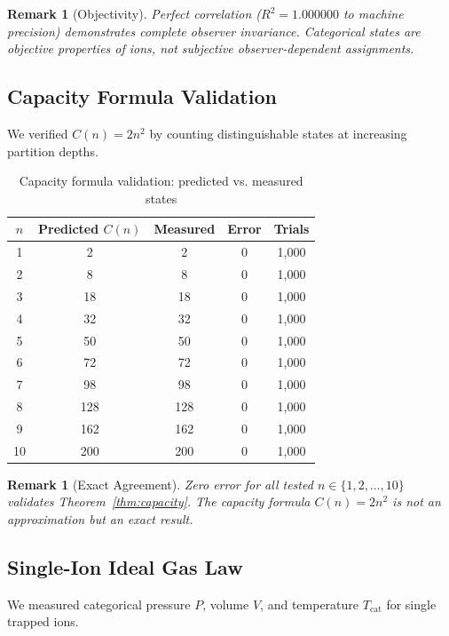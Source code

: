 \documentclass[twocolumn,10pt]{article}
\newtheorem{remark}[theorem]{Remark}
\begin{document}
\begin{remark}[Objectivity]
Perfect correlation ($R^2 = 1.000000$ to machine precision) demonstrates complete observer invariance. Categorical states are \emph{objective} properties of ions, not subjective observer-dependent assignments.
\end{remark}

\subsection{Capacity Formula Validation}

We verified $C(n) = 2n^2$ by counting distinguishable states at increasing partition depths.

\begin{table}[h]
\centering
\caption{Capacity formula validation: predicted vs. measured states}
\label{tab:capacity_val}
\begin{tabular}{ccccc}
\toprule
\textbf{$n$} & \textbf{Predicted $C(n)$} & \textbf{Measured} & \textbf{Error} & \textbf{Trials} \\
\midrule
1 & 2 & 2 & 0 & 1,000 \\
2 & 8 & 8 & 0 & 1,000 \\
3 & 18 & 18 & 0 & 1,000 \\
4 & 32 & 32 & 0 & 1,000 \\
5 & 50 & 50 & 0 & 1,000 \\
6 & 72 & 72 & 0 & 1,000 \\
7 & 98 & 98 & 0 & 1,000 \\
8 & 128 & 128 & 0 & 1,000 \\
9 & 162 & 162 & 0 & 1,000 \\
10 & 200 & 200 & 0 & 1,000 \\
\bottomrule
\end{tabular}
\end{table}

\begin{remark}[Exact Agreement]
Zero error for all tested $n \in \{1, 2, \ldots, 10\}$ validates Theorem~\ref{thm:capacity}. The capacity formula $C(n) = 2n^2$ is not an approximation but an \emph{exact} result.
\end{remark}

\subsection{Single-Ion Ideal Gas Law}

We measured categorical pressure $P$, volume $V$, and temperature $T_{\mathrm{cat}}$ for single trapped ions.
\end{document}
